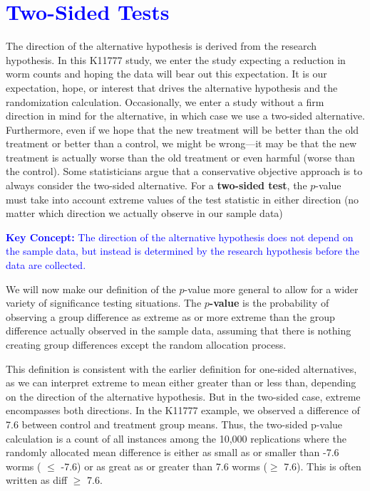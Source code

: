 \documentclass[
]{report}
\begin{document}
\hypertarget{section-3}{%
\section{\texorpdfstring{\textcolor{blue}{Two-Sided Tests}}{}}\label{section-3}}

The direction of the alternative hypothesis is derived from the research hypothesis. In this K11777 study, we enter the study expecting a reduction in worm counts and hoping the data will bear out this expectation. It is our expectation, hope, or interest that drives the alternative hypothesis and the randomization calculation. Occasionally, we enter a study without a firm direction in mind for the alternative, in which case we use a two-sided alternative. Furthermore, even if we hope that the new treatment will be better than the old treatment or better than a control, we might be wrong---it may be that the new treatment is actually worse than the old treatment or even harmful (worse than the control). Some statisticians argue that a conservative objective approach is to always consider the two-sided alternative. For a \textbf{two-sided test}, the \(\scriptstyle p\)-value must take into account extreme values of the test statistic in either direction (no matter which direction we actually observe in our sample data)

\textbf{\textcolor{blue}{Key Concept:}}
\textcolor{blue}{The direction of the alternative hypothesis does not depend on the sample data, but instead is determined by the research hypothesis before the data are collected.}

We will now make our definition of the \(\scriptstyle p\)-value more general to allow for a wider variety of significance testing situations. The \textbf{\(\scriptstyle p\)-value} is the probability of observing a group difference as extreme as or more extreme than the group difference actually observed in the sample data, assuming that there is nothing creating group differences except the random allocation process.

This definition is consistent with the earlier definition for one-sided alternatives, as we can interpret extreme to mean either greater than or less than, depending on the direction of the alternative hypothesis. But in the
two-sided case, extreme encompasses both directions. In the K11777 example, we observed a difference of 7.6 between control and treatment group means. Thus, the two-sided p-value calculation is a count of all instances among the 10,000 replications where the randomly allocated mean difference is either as small as or smaller than -7.6 worms ( \(\scriptstyle \leq\) -7.6) or as great as or greater than 7.6 worms (\(\scriptstyle \geq\) 7.6). This is often written as \textbar diff\textbar{} \(\scriptstyle \geq\) 7.6.
\end{document}
